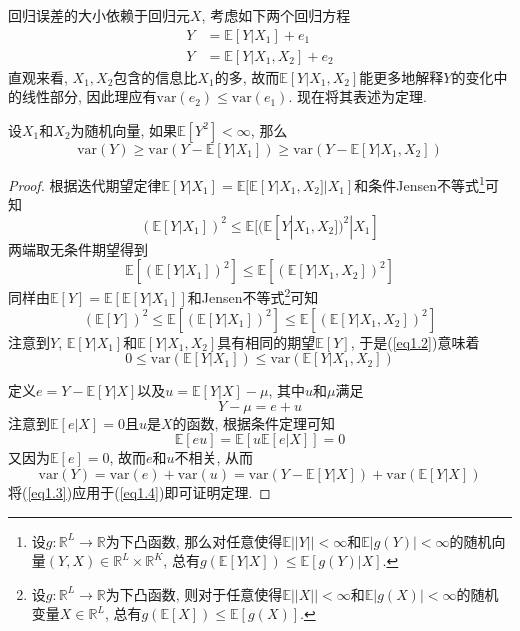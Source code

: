 \documentclass[cn, 12pt, math=mtpro2, bibstyle=apa, blue, twocol]{elegantbook}
\newcommand{\R}{\mathbb{R}}
\newcommand{\E}{\mathbb{E}}
\begin{document}
回归误差的大小依赖于回归元$X$, 考虑如下两个回归方程
\begin{align*}
Y&=\E[Y|X_1]+e_1 \\
Y&=\E[Y|X_1,X_2]+e_2
\end{align*}
直观来看, $X_1,X_2$包含的信息比$X_1$的多, 故而$\E[Y|X_1,X_2]$能更多地解释$Y$的变化中的线性部分, 因此理应有$\text{var}(e_2)\leq\text{var}(e_1)$. 现在将其表述为定理.

\begin{theorem}
  设$X_1$和$X_2$为随机向量, 如果$\E[Y^2]<\infty$, 那么
  $$\text{var}(Y)\geq \text{var}(Y-\E[Y|X_1])\geq\text{var}(Y-\E[Y|X_1,X_2])$$
\end{theorem}

\begin{proof}
  根据迭代期望定律$\E[Y|X_1]=\E[\E[Y|X_1,X_2]|X_1]$和条件Jensen不等式\footnote{设$g:\R^L\to\R$为下凸函数, 那么对任意使得$\E||Y||<\infty$和$\E|g(Y)|<\infty$的随机向量$(Y,X)\in\R^L\times\R^K$, 总有$g(\E[Y|X])\leq \E[g(Y)|X]$.}可知
  $$(\E[Y|X_1])^2\leq\E[(\E[Y|X_1,X_2])^2|X_1]$$
  两端取无条件期望得到
  $$\E[(\E[Y|X_1])^2]\leq \E[(\E[Y|X_1,X_2])^2]$$
  同样由$\E[Y]=\E[\E[Y|X_1]]$和Jensen不等式\footnote{设$g:\R^L\to\R$为下凸函数, 则对于任意使得$\E||X||<\infty$和$\E|g(X)|<\infty$的随机变量$X\in\R^L$, 总有$g(\E[X])\leq\E[g(X)]$.}可知
  \begin{equation}\label{eq1.2}
    (\E[Y])^2\leq\E[(\E[Y|X_1])^2]\leq \E[(\E[Y|X_1,X_2])^2]
  \end{equation}
  注意到$Y$, $\E[Y|X_1]$和$\E[Y|X_1,X_2]$具有相同的期望$\E[Y]$, 于是(\ref{eq1.2})意味着
  \begin{equation}\label{eq1.3}
    0\leq\text{var}(\E[Y|X_1])\leq\text{var}(\E[Y|X_1,X_2])
  \end{equation}

  定义$e=Y-\E[Y|X]$以及$u=\E[Y|X]-\mu$, 其中$u$和$\mu$满足
  $$Y-\mu=e+u$$
  注意到$\E[e|X]=0$且$u$是$X$的函数, 根据条件定理可知
  $$\E[eu]=\E[u\E[e|X]]=0$$
  又因为$\E[e]=0$, 故而$e$和$u$不相关, 从而
  \begin{equation}\label{eq1.4}
    \text{var}(Y)=\text{var}(e)+\text{var}(u)=\text{var}(Y-\E[Y|X])+\text{var}(\E[Y|X])
  \end{equation}
  将(\ref{eq1.3})应用于(\ref{eq1.4})即可证明定理.
\end{proof}
\end{document}
